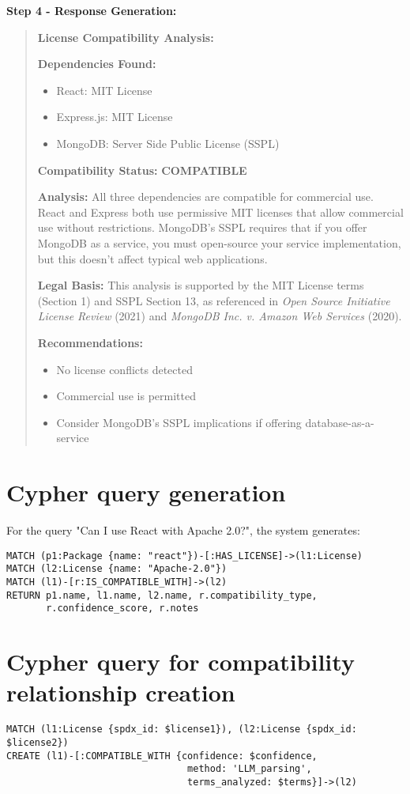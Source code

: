 \documentclass[review]{elsarticle}
\begin{document}
\textbf{Step 4 - Response Generation:}
\begin{quote}
\textbf{License Compatibility Analysis:}

\textbf{Dependencies Found:}
\begin{itemize}
    \item React: MIT License
    \item Express.js: MIT License
    \item MongoDB: Server Side Public License (SSPL)
\end{itemize}

\textbf{Compatibility Status:} \checkmark \textbf{COMPATIBLE}

\textbf{Analysis:} All three dependencies are compatible for commercial use. React and Express both use permissive MIT licenses that allow commercial use without restrictions. MongoDB's SSPL requires that if you offer MongoDB as a service, you must open-source your service implementation, but this doesn't affect typical web applications.

\textbf{Legal Basis:} This analysis is supported by the MIT License terms (Section 1) and SSPL Section 13, as referenced in \textit{Open Source Initiative License Review} (2021) and \textit{MongoDB Inc. v. Amazon Web Services} (2020).

\textbf{Recommendations:}
\begin{itemize}
    \item No license conflicts detected
    \item Commercial use is permitted
    \item Consider MongoDB's SSPL implications if offering database-as-a-service
\end{itemize}
\end{quote}



\section{Cypher query generation}
\label{APP2}


For the query "Can I use React with Apache 2.0?", the system generates:

\begin{verbatim}
MATCH (p1:Package {name: "react"})-[:HAS_LICENSE]->(l1:License)
MATCH (l2:License {name: "Apache-2.0"})
MATCH (l1)-[r:IS_COMPATIBLE_WITH]->(l2)
RETURN p1.name, l1.name, l2.name, r.compatibility_type, 
       r.confidence_score, r.notes
\end{verbatim}



\section{Cypher query for compatibility relationship creation}
\label{APP3}

\begin{verbatim}
MATCH (l1:License {spdx_id: $license1}), (l2:License {spdx_id: $license2})
CREATE (l1)-[:COMPATIBLE_WITH {confidence: $confidence, 
                                method: 'LLM_parsing', 
                                terms_analyzed: $terms}]->(l2)
\end{verbatim}
\end{document}
